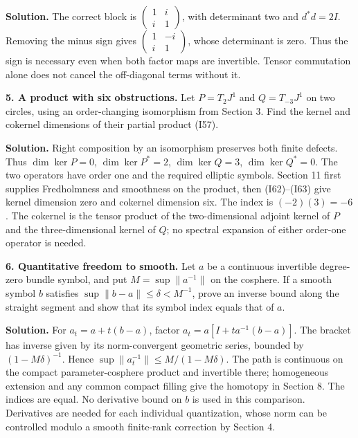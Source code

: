 \documentclass[
  11pt,
]{article}
\makeatletter
\let\ReaderOriginalAnchorStart\hyper@anchorstart
\let\ReaderOriginalAnchorEnd\hyper@anchorend
\let\ReaderPendingAliases\@empty
\def\ReaderArmAliases#1{\gdef\ReaderPendingAliases{#1}}
\def\hyper@anchorstart#1{\ReaderIfNativeAnchorTF{#1}{\ReaderPendingAliases\global\let\ReaderPendingAliases\@empty}{}\ReaderOriginalAnchorStart{#1}}
\makeatother
\begin{document}
\textbf{Solution.} The correct block is
\(\begin{pmatrix}1&i\\i&1\end{pmatrix}\), with determinant two and
\(d^*d=2I\). Removing the minus sign gives
\(\begin{pmatrix}1&-i\\i&1\end{pmatrix}\), whose determinant is zero.
Thus the sign is necessary even when both factor maps are invertible.
Tensor commutation alone does not cancel the off-diagonal terms without
it.

\textbf{5. A product with six obstructions.} Let \(P=T_2J^1\) and
\(Q=T_{-3}J^1\) on two circles, using an order-changing isomorphism from
Section 3. Find the kernel and cokernel dimensions of their partial
product (I57).

\textbf{Solution.} Right composition by an isomorphism preserves both
finite defects. Thus \(\dim\ker P=0\), \(\dim\ker P^*=2\),
\(\dim\ker Q=3\), \(\dim\ker Q^*=0\). The two operators have order one
and the required elliptic symbols. Section 11 first supplies
Fredholmness and smoothness on the product, then (I62)--(I63) give
kernel dimension zero and cokernel dimension six. The index is
\((-2)(3)=-6\). The cokernel is the tensor product of the
two-dimensional adjoint kernel of \(P\) and the three-dimensional kernel
of \(Q\); no spectral expansion of either order-one operator is needed.

\textbf{6. Quantitative freedom to smooth.} Let \(a\) be a continuous
invertible degree-zero bundle symbol, and put \(M=\sup\|a^{-1}\|\) on
the cosphere. If a smooth symbol \(b\) satisfies
\(\sup\|b-a\|\leq\delta<M^{-1}\), prove an inverse bound along the
straight segment and show that its symbol index equals that of \(a\).

\textbf{Solution.} For \(a_t=a+t(b-a)\), factor
\(a_t=a[I+t a^{-1}(b-a)]\). The bracket has inverse given by its
norm-convergent geometric series, bounded by \((1-M\delta)^{-1}\). Hence
\(\sup\|a_t^{-1}\|\leq M/(1-M\delta)\). The path is continuous on the
compact parameter-cosphere product and invertible there; homogeneous
extension and any common compact filling give the homotopy in Section 8.
The indices are equal. No derivative bound on \(b\) is used in this
comparison. Derivatives are needed for each individual quantization,
whose norm can be controlled modulo a smooth finite-rank correction by
Section 4.

\ReaderArmAliases{\ReaderOriginalAnchorStart{references-comparisons-and-research-routes}\ReaderOriginalAnchorEnd\begingroup\expandafter\def\csname @currentHref\endcsname{references-comparisons-and-research-routes}\label{references-comparisons-and-research-routes}\endgroup\ReaderOriginalAnchorStart{references}\ReaderOriginalAnchorEnd}
\end{document}
